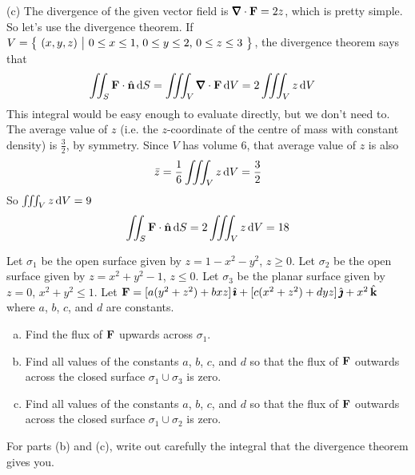 \begin{solution}
\noindent (c) The divergence of the given vector field is
$\vnabla\cdot\vF = 2z$, which is pretty simple. So let's
use the divergence theorem. If 
$V=\Set{(x,y,z)}{0 \le x \le 1$, $0 \le y \le 2$, $0 \le z \le 3}$,
the divergence theorem says that
\begin{align*}
\dblInt_S \vF \cdot \hn\,\dee{S}
&= \tripInt_V \vnabla\cdot\vF\,\dee{V}
= 2\tripInt_V z\,\dee{V}
\end{align*}
This integral would be easy enough to evaluate directly, but we don't
need to. The average value of $z$ (i.e. the $z$-coordinate of the centre
of mass with constant density) is $\frac{3}{2}$, by symmetry. Since $V$
has volume $6$, that average value of $z$ is also
\begin{align*}
\bar z = \frac{1}{6} \iiint_V z\,\mathrm{d}V = \frac{3}{2}
\end{align*}
So $\iiint_V z\,\mathrm{d}V=9$
\begin{align*}
\iint_S \mathbf{F} \cdot \hat{\mathbf{n}}\,\mathrm{d}S
= 2\iiint_V z\,\mathrm{d}V
=18
\end{align*}


\end{solution}

\begin{question}[M317 2010A] %
Let $\sigma_1$ be the open surface given by $z = 1 - x^2 - y^2$, $z \ge 0$. 
Let $\sigma_2$ be the open surface given by $z = x^2 + y^2 - 1$, $z \le 0$. 
Let $\sigma_3$ be the planar surface given by $z = 0$, 
$x^2 + y^2 \le 1$. 
Let $\mathbf{F} = [ a ( y^2 + z^2 ) + bxz ]\,\hat{\pmb{\imath}} 
          + [ c ( x^2 + z^2 ) + dyz ]\,\hat{\pmb{\jmath}} 
          + x^2\,\hat{\mathbf{k}}$
where $a$, $b$, $c$, and $d$ are constants.
\begin{enumerate}[(a)]
\item
Find the flux of $\mathbf{F}$ upwards across $\sigma_1$.
\item
Find all values of the constants $a$, $b$, $c$, and $d$ so that the 
flux of $\mathbf{F}$ outwards across the closed surface $\sigma_1 \cup \sigma_3$ 
is zero.
\item
Find all values of the constants $a$, $b$, $c$, and $d$ so that the 
flux of $\mathbf{F}$ outwards across the closed surface $\sigma_1 \cup \sigma_2$ 
is zero.

\end{enumerate}
\end{question}

\begin{hint} 
For parts (b) and (c), write out carefully the integral that the
divergence theorem gives you.
\end{hint}

